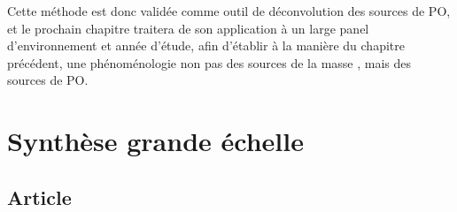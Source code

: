 Cette méthode est donc validée comme outil de déconvolution des sources de PO, et le
prochain chapitre traitera de son application à un large panel d'environnement et année
d'étude, afin d'établir à la manière du chapitre précédent, une phénoménologie non pas des
sources de la masse \PMdix, mais des sources de PO.


\section{Synthèse grande échelle}%
\label{sec:synthèse_grande_échelle}

\subsection{Article}%
\label{sub:article}



